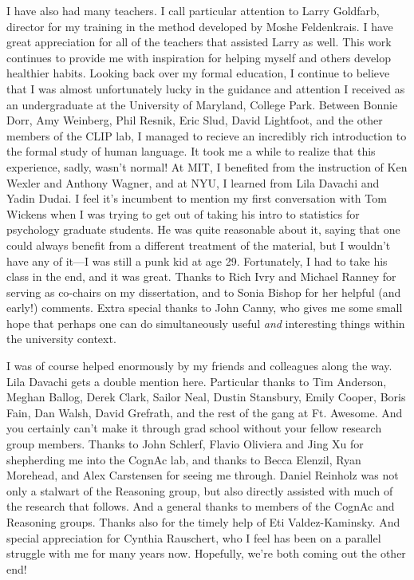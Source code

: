 \documentclass[12pt]{myucthesis}
\begin{document}
\begin{frontmatter}
\begin{acknowledgements}
I have also had many teachers. I call particular attention to Larry Goldfarb,
director for my training in the method developed by Moshe Feldenkrais. I have
great appreciation for all of the teachers that assisted Larry as well. This
work continues to provide me with inspiration for helping myself and others
develop healthier habits. Looking back over my formal education, I continue to
believe that I was almost unfortunately lucky in the guidance and attention I
received as an undergraduate at the University of Maryland, College Park.
Between Bonnie Dorr, Amy Weinberg, Phil Resnik, Eric Slud, David Lightfoot, and
the other members of the CLIP lab, I managed to recieve an incredibly rich
introduction to the formal study of human language.  It took me a while to
realize that this experience, sadly, wasn't normal! At MIT, I benefited from the
instruction of Ken Wexler and Anthony Wagner, and at NYU, I learned from Lila
Davachi and Yadin Dudai.  I feel it's incumbent to mention my first conversation
with Tom Wickens when I was trying to get out of taking his intro to statistics
for psychology graduate students. He was quite reasonable about it, saying that
one could always benefit from a different treatment of the material, but I
wouldn't have any of it---I was still a punk kid at age 29.  Fortunately, I had
to take his class in the end, and it was great. Thanks to Rich Ivry and Michael
Ranney for serving as co-chairs on my dissertation, and to Sonia Bishop for her
helpful (and early!) comments.  Extra special thanks to John Canny, who gives me
some small hope that perhaps one can do simultaneously useful \emph{and}
interesting things within the university context.

I was of course helped enormously by my friends and colleagues along the way.
Lila Davachi gets a double mention here. Particular thanks to Tim Anderson,
Meghan Ballog, Derek Clark, Sailor Neal, Dustin Stansbury, Emily Cooper, Boris
Fain, Dan Walsh, David Grefrath, and the rest of the gang at Ft. Awesome. And
you certainly can't make it through grad school without your fellow research
group members.  Thanks to John Schlerf, Flavio Oliviera and Jing Xu for
shepherding me into the CognAc lab, and thanks to Becca Elenzil, Ryan Morehead,
and Alex Carstensen for seeing me through. Daniel Reinholz was not only a
stalwart of the Reasoning group, but also directly assisted with much of the
research that follows. And a general thanks to members of the CognAc and
Reasoning groups. Thanks also for the timely help of Eti Valdez-Kaminsky. And
special appreciation for Cynthia Rauschert, who I feel has been on a parallel
struggle with me for many years now. Hopefully, we're both coming out the other
end!


\end{acknowledgements}
\end{frontmatter}
\end{document}
